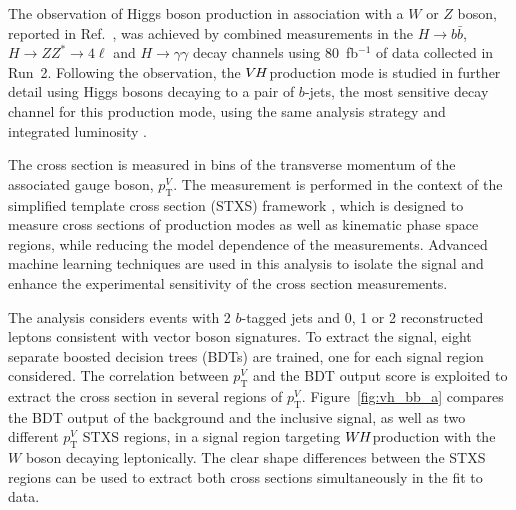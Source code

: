 \documentclass{moriond}
\def\wh{\texorpdfstring{\ensuremath{W\kern -0.1em H}\xspace}{WH\xspace}}
\def\vh{\texorpdfstring{\ensuremath{V\kern -0.1em H}\xspace}{VH\xspace}}
\begin{document}
The observation of Higgs boson production in association with a $W$ or $Z$ boson, reported in
Ref.~\cite{HIGG-2018-04}, was achieved by combined measurements in the $H{\rightarrow}b\bar b$,
$H{\rightarrow}ZZ^*{\rightarrow}4\ell$ and $H{\rightarrow}\gamma\gamma$ decay channels using
80~fb$^{-1}$ of data collected in Run~2.
Following the observation, the \vh production mode is studied in further detail using Higgs bosons
decaying to a pair of $b$-jets, the most sensitive decay channel for this production mode,
using the same analysis strategy and integrated luminosity \cite{Aaboud:2019nan}.

The cross section is measured in bins of the transverse momentum of the associated gauge boson,
$p^{V}_\mathrm{T}$.
The measurement is performed in the context of the simplified template cross section
(STXS) framework \cite{deFlorian:2016spz,Badger:2016bpw},
which is designed to measure cross sections of production modes as well as kinematic phase space
regions, while reducing the model dependence of the measurements.
Advanced machine learning techniques are used in this analysis to isolate the signal and enhance the experimental
sensitivity of the cross section measurements.

The analysis considers events with 2 $b$-tagged jets and 0, 1 or 2 reconstructed leptons consistent
with vector boson signatures. To extract the signal, eight separate boosted decision trees (BDTs)
are trained, one for each signal region considered.
The correlation between $p^{V}_\mathrm{T}$ and the BDT output score is exploited
to extract the cross section in several regions of $p^{V}_\mathrm{T}$.
Figure~\ref{fig:vh_bb_a} compares the BDT output of the background and the inclusive signal,
as well as two different $p^{V}_\mathrm{T}$
STXS regions, in a signal region targeting \wh production with the $W$ boson decaying leptonically.
The clear shape differences between the STXS regions can be used to
extract both cross sections simultaneously in the fit to data.
\end{document}
